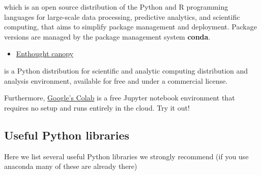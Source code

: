 \documentclass[%
oneside,                 %
final,                   %
10pt]{article}
\begin{document}
\noindent
which is an open source
distribution of the Python and R programming languages for large-scale
data processing, predictive analytics, and scientific computing, that
aims to simplify package management and deployment. Package versions
are managed by the package management system \textbf{conda}. 

\begin{itemize}
\item \href{{https://www.enthought.com/product/canopy/}}{Enthought canopy} 
\end{itemize}

\noindent
is a Python
distribution for scientific and analytic computing distribution and
analysis environment, available for free and under a commercial
license.

Furthermore, \href{{https://colab.research.google.com/notebooks/welcome.ipynb}}{Google's Colab} is a free Jupyter notebook environment that requires 
no setup and runs entirely in the cloud. Try it out!

\subsection*{Useful Python libraries}
Here we list several useful Python libraries we strongly recommend (if you use anaconda many of these are already there)
\end{document}
